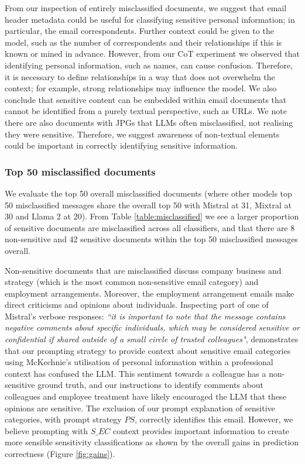 From our inspection of entirely misclassified documents, we suggest that email header metadata could be useful for classifying sensitive personal information; in particular, the email correspondents. Further context could be given to the model, such as the number of correspondents and their relationships if this is known or mined in advance. However, from our CoT experiment we observed that identifying personal information, such as names, can cause confusion. Therefore, it is necessary to define relationships in a way that does not overwhelm the context; for example, strong relationships may influence the model. We also conclude that sensitive content can be embedded within email documents that cannot be identified from a purely textual perspective, such as URLs. We note there are also documents with JPGs that LLMs often misclassified, not realising they were sensitive. Therefore, we suggest awareness of non-textual elements could be important in correctly identifying sensitive information.

\subsubsection{Top 50 misclassified documents}
We evaluate the top 50 overall misclassified documents (where other models top 50 misclassified messages share the overall top 50 with Mistral at 31, Mixtral at 30 and Llama 2 at 20). From Table \ref{table:misclassified} we see a larger proportion of sensitive documents are misclassified across all classifiers, and that there are 8 non-sensitive and 42 sensitive documents within the top 50 misclassified messages overall.

Non-sensitive documents that are misclassified discuss company business and strategy (which is the most common non-sensitive email category) and employment arrangements. Moreover, the employment arrangement emails make direct criticisms and opinions about individuals. Inspecting part of one of Mistral’s verbose responses: \textit{``it is important to note that the message contains negative comments about specific individuals, which may be considered sensitive or confidential if shared outside of a small circle of trusted colleagues"}, demonstrates that our prompting strategy to provide context about sensitive email categories using McKechnie’s utilisation of personal information within a professional context \cite{mckechnie2024sara} has confused the LLM. This sentiment towards a colleague has a non-sensitive ground truth, and our instructions to identify comments about colleagues and employee treatment have likely encouraged the LLM that these opinions are sensitive. The exclusion of our prompt explanation of sensitive categories, with prompt strategy $PS$, correctly identifies this email. However, we believe prompting with $S\_EC$ context provides important information to create more sensible sensitivity classifications as shown by the overall gains in prediction correctness (Figure \ref{fig:gains}).

